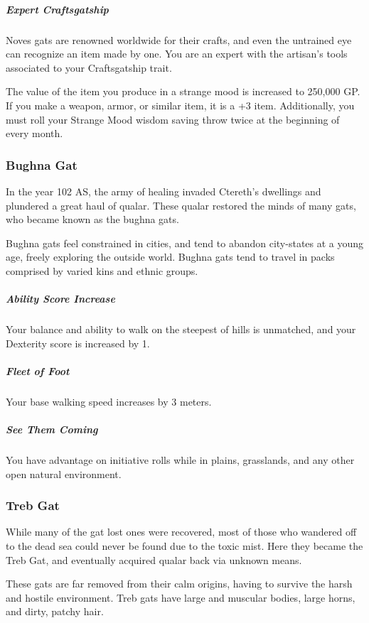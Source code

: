     \subparagraph{Expert Craftsgatship} Noves gats are renowned worldwide for their crafts, and even the untrained eye can recognize an item made by one.
    You are an expert with the artisan's tools associated to your Craftsgatship trait.

    The value of the item you produce in a strange mood is increased to 250,000 GP.
    If you make a weapon, armor, or similar item, it is a +3 item.
    Additionally, you must roll your Strange Mood wisdom saving throw twice at the beginning of every month.

\subsubsection{Bughna Gat}
    In the year 102 AS, the army of healing invaded Ctereth's dwellings and plundered a great haul of qualar.
    These qualar restored the minds of many gats, who became known as the bughna gats.

    Bughna gats feel constrained in cities, and tend to abandon city-states at a young age, freely exploring the outside world.
    Bughna gats tend to travel in packs comprised by varied kins and ethnic groups.

    \subparagraph{Ability Score Increase} Your balance and ability to walk on the steepest of hills is unmatched, and your Dexterity score is increased by 1.

    \subparagraph{Fleet of Foot} Your base walking speed increases by 3 meters.

    \subparagraph{See Them Coming} You have advantage on initiative rolls while in plains, grasslands, and any other open natural environment.

\subsubsection{Treb Gat}
    While many of the gat lost ones were recovered, most of those who wandered off to the dead sea could never be found due to the toxic mist.
    Here they became the Treb Gat, and eventually acquired qualar back via unknown means.

    These gats are far removed from their calm origins, having to survive the harsh and hostile environment.
    Treb gats have large and muscular bodies, large horns, and dirty, patchy hair.

